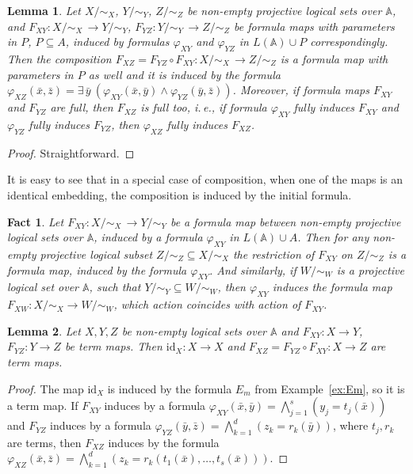 \documentclass[12pt]{article}
\newtheorem{lemma}{Lemma}
\newtheorem{fact}{Fact}
\theoremstyle{definition}
\def\MA{{\mathbb{A}}}
\def\id{{\mathrm{id}}}
\begin{document}
\begin{lemma}\label{lemma:composition}
Let $X/{\sim_X}$, $Y/{\sim_Y}$, $Z/{\sim_Z}$ be non-empty projective logical sets over $\MA$, and $F_{XY}\colon X/{\sim_X}\,\to Y/{\sim_Y}$, $F_{YZ}\colon Y/{\sim_Y}\,\to Z/{\sim_Z}$ be formula maps with parameters in $P$, $P\subseteq A$, induced by formulas $\varphi_{XY}$ and $\varphi_{YZ}$ in $L(\MA)\cup P$ correspondingly. Then the composition $F_{XZ}=F_{YZ}\circ F_{XY}\colon X/{\sim_X}\,\to Z/{\sim_Z}$ is a formula map with parameters in $P$ as well and it is induced by the formula $
\varphi_{XZ}(\bar x,\bar z)=\exists\,\bar y \:(\varphi_{XY}(\bar x,\bar y) \wedge \varphi_{YZ}(\bar y,\bar z))$. Moreover, if formula maps $F_{XY}$ and $F_{YZ}$ are full, then $F_{XZ}$ is full too, i.\,e., if formula $\varphi_{XY}$ fully induces $F_{XY}$ and $\varphi_{YZ}$ fully induces $F_{YZ}$, then $\varphi_{XZ}$ fully induces $F_{XZ}$.
\end{lemma}

\begin{proof}
Straightforward.
\end{proof}

It is easy to see that in a special case of composition, when one of the maps is an identical embedding, the composition is induced by the initial formula.

\begin{fact}\label{remark:rest}
Let $F_{XY}\colon X/{\sim_X} \,\to Y/{\sim_Y}$ be a formula map between non-empty projective logical sets over $\MA$, induced by a formula $\varphi_{XY}$ in $L(\MA)\cup A$. Then for any non-empty projective logical subset $Z/{\sim_Z}\subseteq X/{\sim_X}$ the restriction of $F_{XY}$ on $Z/{\sim_Z}$ is a formula map, induced by the formula $\varphi_{XY}$. And similarly, if $W/{\sim_W}$ is a projective logical set over $\MA$, such that $Y/{\sim_Y}\subseteq W/{\sim_W}$, then $\varphi_{XY}$ induces the formula map $F_{XW}\colon X/{\sim_X}\to W/{\sim_W}$, which action coincides with action of $F_{XY}$.
\end{fact}

\begin{lemma}\label{cat_term}
Let $X, Y, Z$ be non-empty logical sets over $\MA$ and $F_{XY}\colon X\to Y$, $F_{YZ}\colon Y\to Z$ be term maps. Then $\id_X\colon X \to X$ and $F_{XZ}=F_{YZ}\circ F_{XY}\colon X\to Z$ are term maps.
\end{lemma}

\begin{proof}
The map $\id_X$ is induced by the formula $E_m$ from Example~\ref{ex:Em}, so it is a term map. If $F_{XY}$ induces by a formula $\varphi_{XY}(\bar x,\bar y)=\bigwedge_{j=1}^s (y_j=t_j(\bar x))$ and $F_{YZ}$ induces by a formula $\varphi_{YZ}(\bar y,\bar z)=\bigwedge_{k=1}^d (z_k=r_k(\bar y))$, where $t_j,r_k$ are terms, then $F_{XZ}$ induces by the formula $\varphi_{XZ}(\bar x,\bar z)=\bigwedge_{k=1}^d (z_k=r_k(t_1(\bar x),\ldots,t_s(\bar x)))$.
\end{proof}
\end{document}

